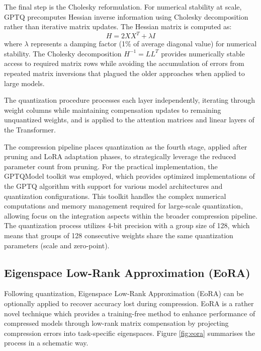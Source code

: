 The final step is the Cholesky reformulation. For numerical stability at scale, GPTQ precomputes Hessian inverse information using Cholesky decomposition rather than iterative matrix updates. The Hessian matrix is computed as:
\begin{equation}
H = 2XX^T + \lambda I
\end{equation}
where $\lambda$ represents a damping factor (1\% of average diagonal value) for numerical stability. The Cholesky decomposition $H^{-1} = LL^T$ provides numerically stable access to required matrix rows while avoiding the accumulation of errors from repeated matrix inversions that plagued the older approaches when applied to large models.

The quantization procedure processes each layer independently, iterating through weight columns while maintaining compensation updates to remaining unquantized weights, and is applied to the attention matrices and linear layers of the Transformer.

The compression pipeline places quantization as the fourth stage, applied after pruning and LoRA adaptation phases, to strategically leverage the reduced parameter count from pruning. For the practical implementation, the GPTQModel toolkit \cite{gptqmodel} was employed, which provides optimized implementations of the GPTQ algorithm with support for various model architectures and quantization configurations. This toolkit handles the complex numerical computations and memory management required for large-scale quantization, allowing focus on the integration aspects within the broader compression pipeline. The quantization process utilizes 4-bit precision with a group size of 128, which means that groups of 128 consecutive weights share the same quantization parameters (scale and zero-point).

\subsection{Eigenspace Low-Rank Approximation (EoRA)} \label{eora}

Following quantization, Eigenspace Low-Rank Approximation (EoRA) \cite{eora} can be optionally applied to recover accuracy lost during compression. EoRA is a rather novel technique which provides a training-free method to enhance performance of compressed models through low-rank matrix compensation by projecting compression errors into task-specific eigenspaces. Figure \ref{fig:eora} summarises the process in a schematic way.



